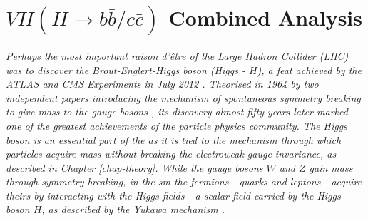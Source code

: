 \chapter{$VH (H \rightarrow b\bar{b}/c\bar{c})$ Combined Analysis}\label{chap-VH}
\ChapFrame

\textit{Perhaps the most important \textit{raison d'être} of the \textit{Large Hadron Collider} (LHC) was to discover the Brout-Englert-Higgs boson (Higgs - $H$), a feat achieved by the ATLAS and CMS Experiments in July 2012 \cite{ATLAS:2012yve, CMS:2012qbp}. Theorised in 1964 by two independent papers introducing the mechanism of spontaneous symmetry breaking to give mass to the gauge bosons \cite{Englert:1964et,  PhysRevLett.13.508}, its discovery almost fifty years later marked one of the greatest achievements of the particle physics community. The Higgs boson is an essential part of the  as it is tied to the mechanism through which particles acquire mass without breaking the electroweak gauge invariance, as described in Chapter \ref{chap-theory}. While the gauge bosons $W$ and $Z$ gain mass through symmetry breaking, in the \gls{sm} the fermions - quarks and leptons - acquire theirs by interacting with the Higgs fields -  a scalar field carried by the Higgs boson $H$, as described by the Yukawa mechanism \cite{10.1143/PTPS.1.1}.}\\


